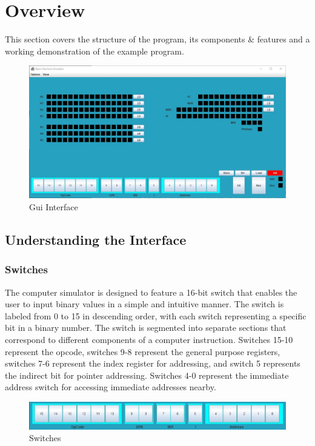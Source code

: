 \documentclass[10pt]{article}
\begin{document}
\section{Overview}
This section covers the structure of the program, its components \& features and 
a working demonstration of the example program.
\begin{figure}[H]
  \centering
  \includegraphics[width=1.0\textwidth]{Pics/Fig0.jpg}
  \caption{Gui Interface}
  \label{fig:gui_interface}
\end{figure}

\subsection{Understanding the Interface}
\subsubsection{Switches}
The computer simulator is designed to feature a 16-bit switch that enables the user to input binary 
values in a simple and intuitive manner. The switch is labeled from 0 to 15 in descending order, 
with each switch representing a specific bit in a binary number. The switch is segmented into separate 
sections that correspond to different components of a computer instruction. Switches 15-10 represent 
the opcode, switches 9-8 represent the general purpose registers, switches 7-6 represent the index register 
for addressing, and switch 5 represents the indirect bit for pointer addressing. Switches 4-0 represent the 
immediate address switch for accessing immediate addresses nearby.

\begin{figure}[H]
  \centering
  \includegraphics[width=1.0\textwidth]{Pics/Fig1.jpg}
  \caption{Switches}
  \label{fig:switches}
\end{figure}
\end{document}
